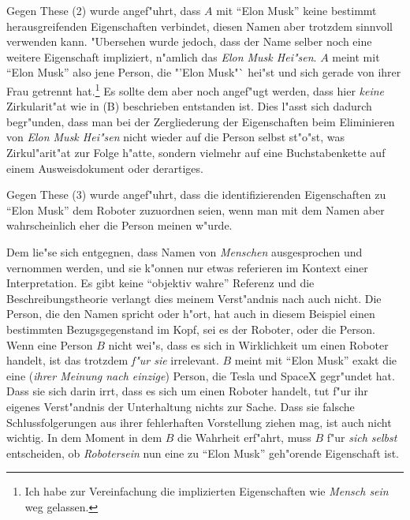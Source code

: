 \documentclass[a4paper, emulatestandardclasses, 12pt]{scrartcl}
\begin{document}
\begin{onehalfspace}
Gegen These (2) wurde angef"uhrt, dass $A$ mit "`Elon Musk"' keine bestimmt herausgreifenden Eigenschaften verbindet, diesen Namen aber trotzdem sinnvoll verwenden kann. "Ubersehen wurde jedoch, dass der Name selber noch eine weitere Eigenschaft impliziert, n"amlich das \emph{Elon Musk Hei"sen}. $A$ meint mit "`Elon Musk"' also jene Person, die "'Elon Musk"` hei"st und sich gerade von ihrer Frau getrennt hat.\footnote{Ich habe zur Vereinfachung die implizierten Eigenschaften wie \emph{Mensch sein} weg gelassen.} Es sollte dem aber noch angef"ugt werden, dass hier \emph{keine} Zirkularit"at wie in (B) beschrieben entstanden ist. Dies l"asst sich dadurch begr"unden, dass man bei der Zergliederung der Eigenschaften beim Eliminieren von \emph{Elon Musk Hei"sen} nicht wieder auf die Person selbst st"o"st, was Zirkul"arit"at zur Folge h"atte, sondern vielmehr auf eine Buchstabenkette auf einem Ausweisdokument oder derartiges.

Gegen These (3) wurde angef"uhrt, dass die identifizierenden Eigenschaften zu "`Elon Musk"' dem Roboter zuzuordnen seien, wenn man mit dem Namen aber wahrscheinlich eher die Person meinen w"urde.  

Dem lie"se sich entgegnen, dass Namen von \emph{Menschen} ausgesprochen und vernommen werden, und sie k"onnen nur etwas referieren im Kontext einer Interpretation. Es gibt keine "`objektiv wahre"' Referenz und die Beschreibungstheorie verlangt dies meinem Verst"andnis nach auch nicht. Die Person, die den Namen spricht oder h"ort, hat auch in diesem Beispiel einen bestimmten Bezugsgegenstand im Kopf, sei es der Roboter, oder die Person. Wenn eine Person $B$ nicht wei"s, dass es sich in Wirklichkeit um einen Roboter handelt, ist das trotzdem \emph{f"ur sie} irrelevant. $B$ meint mit "`Elon Musk"' exakt die eine (\emph{ihrer Meinung nach einzige}) Person, die Tesla und SpaceX gegr"undet hat. Dass sie sich darin irrt, dass es sich um einen Roboter handelt, tut f"ur ihr eigenes Verst"andnis der Unterhaltung nichts zur Sache. Dass sie falsche Schlussfolgerungen aus ihrer fehlerhaften Vorstellung ziehen mag, ist auch nicht wichtig. In dem Moment in dem $B$ die Wahrheit erf"ahrt, muss $B$ f"ur \emph{sich selbst} entscheiden, ob \emph{Robotersein} nun eine zu "`Elon Musk"' geh"orende Eigenschaft ist.


\end{onehalfspace}


\end{document}

